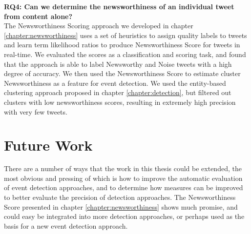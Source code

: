 \newpage
\textbf{RQ4: Can we determine the newsworthiness of an individual tweet from content alone?} \\
The Newsworthiness Scoring approach we developed in chapter \ref{chapter:newsworthiness} uses a set of heuristics to assign quality labels to tweets and learn term likelihood ratios to produce Newsworthiness Score for tweets in real-time.
We evaluated the scores as a classification and scoring task, and found that the approach is able to label Newsworthy and Noise tweets with a high degree of accuracy.
We then used the Newsworthiness Score to estimate cluster Newsworthiness as a feature for event detection. We used the entity-based clustering approach proposed in chapter \ref{chapter:detection}, but filtered out clusters with low newsworthiness scores, resulting in extremely high precision with very few tweets.

\section{Future Work}
There are a number of ways that the work in this thesis could be extended, the most obvious and pressing of which is how to improve the automatic evaluation of event detection approaches, and to determine how measures can be improved to better evaluate the precision of detection approaches.
The Newsworthiness Score presented in chapter \ref{chapter:newsworthiness} shows much promise, and could easy be integrated into more detection approaches, or perhaps used as the basis for a new event detection approach.